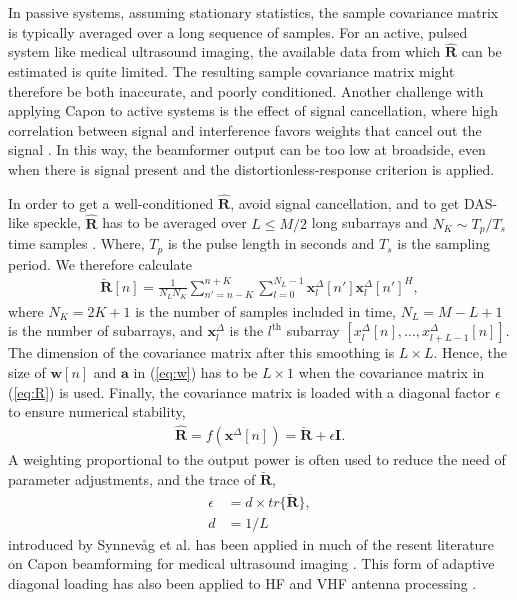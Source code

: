 \documentclass[journal]{IEEEtran}
\newcommand{\mat}[1]{\mathbf{#1}}
\renewcommand{\vec}[1]{\mathbf{#1}}
\begin{document}
In passive systems, assuming stationary statistics, the sample covariance matrix is typically averaged over a long sequence of samples\cite{Krima}. For an active, pulsed system like medical ultrasound imaging, the available data from which $\mat{\hat{R}}$ can be estimated is quite limited. The resulting sample covariance matrix might therefore be both inaccurate, and poorly conditioned. Another challenge with applying Capon to active systems is the effect of signal cancellation, where high correlation between signal and interference favors weights that cancel out the signal \cite{Reddy1987}. In this way, the beamformer output can be too low at broadside, even when there is signal present and the distortionless-response criterion is applied. 

In order to get a well-conditioned $\mat{\hat{R}}$, avoid signal cancellation, and to get DAS-like speckle, $\mat{\hat{R}}$ has to be averaged over $L\le M/2$ long subarrays and $N_K \sim T_p/T_s$ time samples \cite{Synnevag2007, Synnevag2007a}. Where, $T_p$ is the pulse length in seconds and $T_s$ is the sampling period. We therefore calculate
\begin{align}
\mat{\breve{R}}[n] = \frac{1}{N_LN_K}\sum_{n'=n-K}^{n+K} \sum_{l=0}^{N_L-1} \vec{x}_l^{\Delta}[n']\vec{x}_l^{\Delta}[n']^H,\label{eq:R}
\end{align}
where  $N_K = 2K + 1$ is the number of samples included in time, $N_L = M-L+1$ is the number of subarrays, and $\vec{x}_l^{\Delta}$ is the $l^\text{th}$ subarray $[x_l^{\Delta}[n], \dotso, x_{l+L-1}^{\Delta}[n]]$. The dimension of the covariance matrix after this smoothing is $L \times L$. Hence, the size of $\vec{w}[n]$ and $\vec{a}$ in (\ref{eq:w}) has to be $L \times 1$ when the covariance matrix in (\ref{eq:R}) is used.
Finally, the covariance matrix is loaded with a diagonal factor $\epsilon$ to ensure numerical stability, 
\begin{align}\label{eq:diag}
\mat{\hat{R}} =  f(\vec{x}^{\Delta}[n]) = \mat{\breve{R}} + \epsilon\mat{I}.
\end{align}
A weighting proportional to the output power is often used to reduce the need of parameter adjustments, and the trace of $\mat{\breve{R}}$, 
\begin{align}\label{eq:diag_adapt}
\epsilon &= d \times tr\{\mat{\breve{R}}\}, \\
d &= 1/L
\end{align}
introduced by Synnev\aa{}g et al. \cite{Synnevag2007} has been applied in much of the resent literature on Capon beamforming for medical ultrasound imaging \cite{Nilsen2009, Wang2009, Mehdizadeh2012}. This form of adaptive diagonal loading has also been applied to HF and VHF antenna processing \cite{Featherstone1997}.
\end{document}

